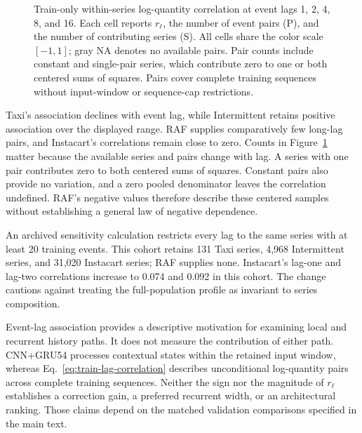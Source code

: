 \documentclass[runningheads]{llncs}
\providecommand{\Description}[1]{}
\begin{document}
\begin{figure}[htbp]
\caption{Train-only within-series log-quantity correlation at event lags 1, 2, 4, 8, and 16. Each cell reports $r_{\ell}$, the number of event pairs (P), and the number of contributing series (S). All cells share the color scale $[-1,1]$; gray NA denotes no available pairs. Pair counts include constant and single-pair series, which contribute zero to one or both centered sums of squares. Pairs cover complete training sequences without input-window or sequence-cap restrictions.}
\label{fig:train-lag-correlation}
\Description{A four-by-five heatmap. Taxi correlation declines from 0.749 at lag one to negative values at lags eight and sixteen. Intermittent remains positive, declining from 0.928 to 0.473. RAF has small negative correlations through lag eight and no pairs at lag sixteen. Instacart correlations remain close to zero. Pair and series counts are printed in every cell.}
\end{figure}

Taxi's association declines with event lag, while Intermittent retains
positive association over the displayed range. RAF supplies comparatively
few long-lag pairs, and Instacart's correlations remain close to zero.
Counts in Figure~\ref{fig:train-lag-correlation} matter because the available
series and pairs change with lag. A series with one pair contributes zero
to both centered sums of squares. Constant pairs also provide no variation,
and a zero pooled denominator leaves the correlation undefined.
RAF's negative values therefore describe these centered samples without
establishing a general law of negative dependence.

An archived sensitivity calculation restricts every lag to the same series
with at least 20 training events. This cohort retains 131 Taxi series,
4,968 Intermittent series, and 31,020 Instacart series; RAF supplies none.
Instacart's lag-one and lag-two correlations increase to 0.074 and 0.092
in this cohort. The change cautions against treating the full-population
profile as invariant to series composition.

Event-lag association provides a descriptive motivation for examining local
and recurrent history paths. It does not measure the contribution of either
path. CNN+GRU54 processes contextual states within the retained input window,
whereas Eq.~\eqref{eq:train-lag-correlation} describes unconditional
log-quantity pairs across complete training sequences. Neither the sign nor
the magnitude of $r_{\ell}$ establishes a correction gain, a preferred
recurrent width, or an architectural ranking. Those claims depend on the
matched validation comparisons specified in the main text.
\end{document}

